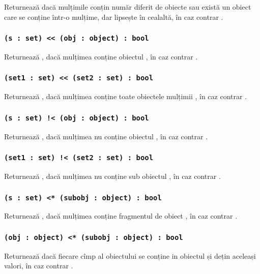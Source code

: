 Returnează \true{} dacă mulțimile conțin număr diferit de obiecte sau există un obiect care se conține într-o mulțime, dar lipsește în cealaltă, în caz contrar \false{}.

\subsubsection{\lstinline|(s : set) << (obj : object) : bool|}

Returnează \true{}, dacă mulțimea  conține obiectul , în caz contrar \false{}.

\subsubsection{\lstinline|(set1 : set) << (set2 : set) : bool|}

Returnează \true, dacă mulțimea  conține toate obiectele mulțimii , în caz contrar \false.

\subsubsection{\lstinline|(s : set) !< (obj : object) : bool|}

Returnează \true{}, dacă mulțimea  nu conține obiectul , în caz contrar \false{}.

\subsubsection{\lstinline|(set1 : set) !< (set2 : set) : bool|}

Returnează \true, dacă mulțimea  nu conține sub obiectul , în caz contrar \false.

\subsubsection{\lstinline|(s : set) <* (subobj : object) : bool|}

Returnează \true{}, dacă mulțimea  conține fragmentul de obiect , în caz contrar \false{}.

\subsubsection{\lstinline|(obj : object) <* (subobj : object) : bool|}

Returnează \true{} dacă fiecare cîmp al obiectului  se conține in obiectul  și dețin aceleași valori, în caz contrar \false{}.

